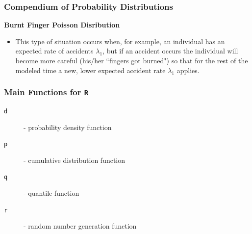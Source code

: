 \documentclass[MAIN.tex]{subfiles}
\begin{document}
\begin{frame}
	\frametitle{Compendium of Probability Distributions}
\textbf{Burnt Finger Poisson Disribution}
\begin{itemize}
\item This type of situation occurs when, for example, an individual has an expected rate of accidents $\lambda_1$, but if an accident occurs the individual will become more careful (his/her ``fingers got burned") so that for the rest of the modeled time a new, lower expected accident rate $\lambda_1$ applies.
\end{itemize}
\end{frame}
\begin{frame}
	\frametitle{Main Functions for \texttt{R}}
\begin{description}
\item[\texttt{d}] - probability density function
\item[\texttt{p}] - cumulative distribution function
\item[\texttt{q}] - quantile function
\item[\texttt{r}] - random number generation function
\end{description}

\end{frame}
\end{document}
